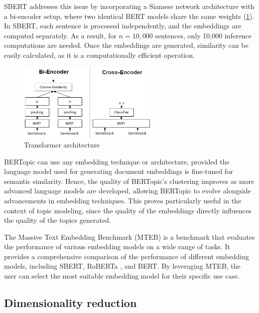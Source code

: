 SBERT addresses this issue by incorporating a Siamese network architecture with a bi-encoder setup, where two identical BERT models share the same weights (\cref{fig:bi_vs_cross}). In SBERT, each sentence is processed independently, and the embeddings are computed separately. As a result, for \( n = 10,000 \) sentences, only 10,000 inference computations are needed. Once the embeddings are generated, similarity can be easily calculated, as it is a computationally efficient operation.

\begin{figure}[h]
    \centering
    \includegraphics[width=0.6\textwidth]{figures/bi_vs_cross.png}
    \caption{Transformer architecture}
    \label{fig:bi_vs_cross}
\end{figure}

BERTopic can use any embedding technique or architecture, provided the language model used for generating document embeddings is fine-tuned for semantic similarity. Hence, the quality of BERTopic's clustering improves as more advanced language models are developed, allowing BERTopic to evolve alongside advancements in embedding techniques. This proves particularly useful in the context of topic modeling, since the quality of the embeddings directly influences the quality of the topics generated.

The Massive Text Embedding Benchmark (MTEB) \cite{muennighoff_mteb_2023} is a benchmark that evaluates the performance of various embedding models on a wide range of tasks. It provides a comprehensive comparison of the performance of different embedding models, including SBERT, RoBERTa \cite{liu_roberta_2019}, and BERT. By leveraging MTEB, the user can select the most suitable embedding model for their specific use case.

\subsection{Dimensionality reduction}

